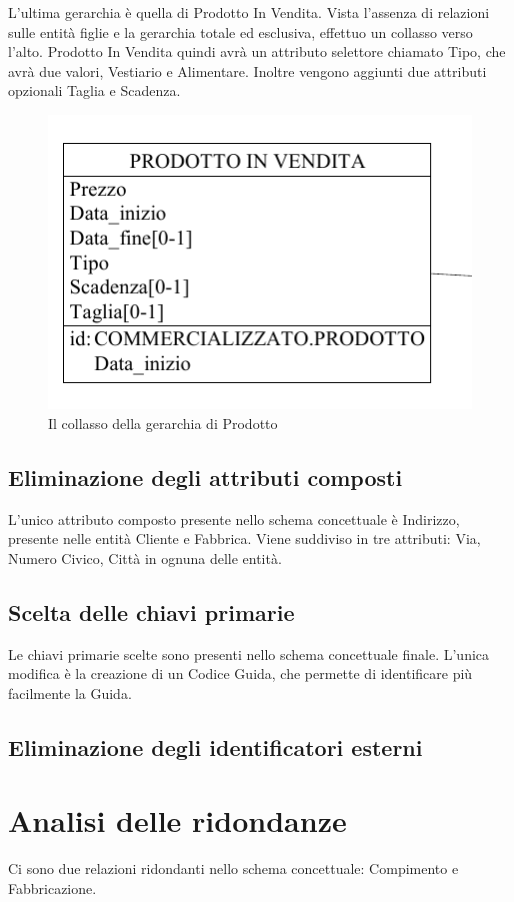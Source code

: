 \documentclass[a4paper,12pt]{report}
\begin{document}
L'ultima gerarchia è quella di Prodotto In Vendita. Vista l'assenza di relazioni sulle entità figlie e la gerarchia totale ed esclusiva, effettuo un collasso verso l'alto. 
Prodotto In Vendita quindi avrà un attributo selettore chiamato Tipo, che avrà due valori, Vestiario e Alimentare. Inoltre vengono aggiunti due attributi opzionali Taglia e Scadenza.
\begin{figure}[H]
	\centering{}
	\includegraphics[width=\textwidth]{img/SchemaLogico-Prodotto.pdf}
	\caption{Il collasso della gerarchia di Prodotto}
\end{figure}
\subsection{Eliminazione degli attributi composti}
L'unico attributo composto presente nello schema concettuale è Indirizzo, presente nelle entità Cliente e Fabbrica. Viene suddiviso in tre attributi: Via, Numero Civico, Città in ognuna delle entità.
\subsection{Scelta delle chiavi primarie}
Le chiavi primarie scelte sono presenti nello schema concettuale finale. 
L'unica modifica è la creazione di un Codice Guida, che permette di identificare più facilmente la Guida.
\subsection{Eliminazione degli identificatori esterni}
\section{Analisi delle ridondanze}
Ci sono due relazioni ridondanti nello schema concettuale: Compimento e Fabbricazione.
\end{document}
